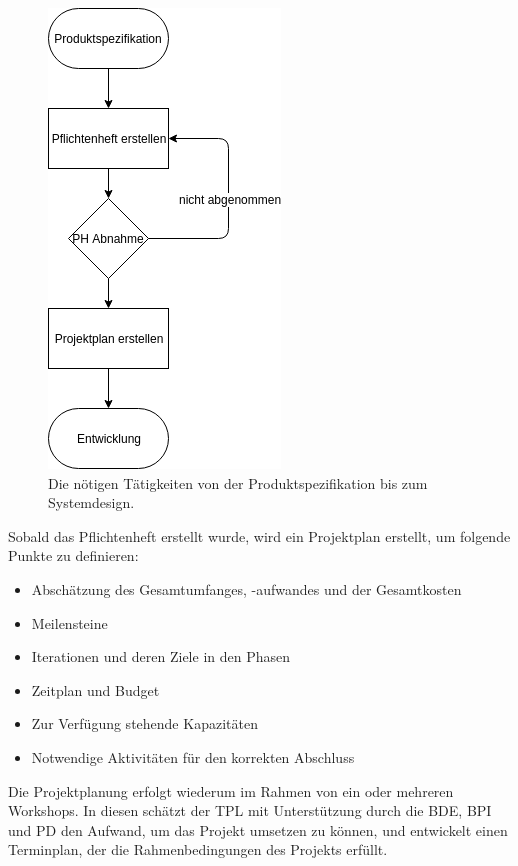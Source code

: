 \begin{figure}[h]
    \centering
    \includegraphics[keepaspectratio,height=0.8\textwidth]{images/3_2_1_2_Produktspezifiktation_redraw.png}
    \caption[Produktspezifikation bis Systemdesign]{Die nötigen Tätigkeiten von der Produktspezifikation bis zum Systemdesign.}
    \label{fig:Produktspezifiktation}
  \end{figure}

Sobald das Pflichtenheft erstellt wurde, wird ein Projektplan erstellt, um folgende Punkte zu definieren:

\begin{itemize}

    \item Abschätzung des Gesamtumfanges, -aufwandes und der Gesamtkosten
    \item Meilensteine 
    \item Iterationen und deren Ziele in den Phasen
    \item Zeitplan und Budget
    \item Zur Verfügung stehende Kapazitäten 
    \item Notwendige Aktivitäten für den korrekten Abschluss

\end{itemize}

Die Projektplanung erfolgt wiederum im Rahmen von ein oder mehreren Workshops. In diesen schätzt der \ac{TPL} mit Unterstützung durch die \ac{BDE}, \ac{BPI} und \ac{PD} den Aufwand, um das Projekt umsetzen zu können, und entwickelt einen Terminplan, der die Rahmenbedingungen des Projekts erfüllt.

